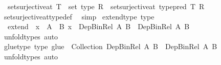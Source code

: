 \begin{isabellebody}
\ \ {\isachardoublequoteopen}set{\isacharunderscore}{\kern0pt}surjective{\isacharunderscore}{\kern0pt}at\ {\isacharparenleft}{\kern0pt}T\ {\isacharcolon}{\kern0pt}{\isacharcolon}{\kern0pt}\ set\ type{\isacharparenright}{\kern0pt}\ R\ {\isasymlongleftrightarrow}\ set{\isacharunderscore}{\kern0pt}surjective{\isacharunderscore}{\kern0pt}at\ {\isacharparenleft}{\kern0pt}type{\isacharunderscore}{\kern0pt}pred\ T{\isacharparenright}{\kern0pt}\ R{\isachardoublequoteclose}\isanewline
%
\isadelimproof
\ \ %
\endisadelimproof
%
\isatagproof
{}\isamarkupfalse%
\ set{\isacharunderscore}{\kern0pt}surjective{\isacharunderscore}{\kern0pt}at{\isacharunderscore}{\kern0pt}type{\isacharunderscore}{\kern0pt}def\ \isamarkupfalse%
\ simp%
\endisatagproof
{\isafoldproof}%
%
\isadelimproof
%
\endisadelimproof
%
\isadelimdocument
%
\endisadelimdocument
%
\isatagdocument
%
\isamarkuptrue%
%
\endisatagdocument
{\isafolddocument}%
%
\isadelimdocument
%
\endisadelimdocument
{}\isamarkupfalse%
\ extend{\isacharunderscore}{\kern0pt}type\ {\isacharbrackleft}{\kern0pt}type{\isacharbrackright}{\kern0pt}{\isacharcolon}{\kern0pt}\isanewline
\ \ {\isachardoublequoteopen}extend\ {\isacharcolon}{\kern0pt}\ {\isacharparenleft}{\kern0pt}x\ {\isacharcolon}{\kern0pt}\ A{\isacharparenright}{\kern0pt}\ {\isasymRightarrow}\ B\ x\ {\isasymRightarrow}\ Dep{\isacharunderscore}{\kern0pt}Bin{\isacharunderscore}{\kern0pt}Rel\ A\ B\ {\isasymRightarrow}\ Dep{\isacharunderscore}{\kern0pt}Bin{\isacharunderscore}{\kern0pt}Rel\ A\ B{\isachardoublequoteclose}\isanewline
%
\isadelimproof
\ \ %
\endisadelimproof
%
\isatagproof
{}\isamarkupfalse%
\ unfold{\isacharunderscore}{\kern0pt}types\ auto%
\endisatagproof
{\isafoldproof}%
%
\isadelimproof
\isanewline
%
\endisadelimproof
\isanewline
{}\isamarkupfalse%
\ glue{\isacharunderscore}{\kern0pt}type\ {\isacharbrackleft}{\kern0pt}type{\isacharbrackright}{\kern0pt}{\isacharcolon}{\kern0pt}\ {\isachardoublequoteopen}glue\ {\isacharcolon}{\kern0pt}\ Collection\ {\isacharparenleft}{\kern0pt}Dep{\isacharunderscore}{\kern0pt}Bin{\isacharunderscore}{\kern0pt}Rel\ A\ B{\isacharparenright}{\kern0pt}\ {\isasymRightarrow}\ Dep{\isacharunderscore}{\kern0pt}Bin{\isacharunderscore}{\kern0pt}Rel\ A\ B{\isachardoublequoteclose}\isanewline
%
\isadelimproof
\ \ %
\endisadelimproof
%
\isatagproof
{}\isamarkupfalse%
\ unfold{\isacharunderscore}{\kern0pt}types\ auto%
\endisatagproof
{\isafoldproof}%
%
\isadelimproof
\isanewline
%
\endisadelimproof

\end{isabellebody}
